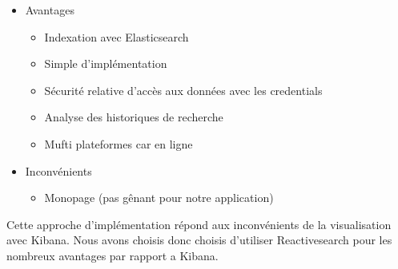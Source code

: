 \newpage
\begin{itemize}
    \item Avantages 
        \begin{itemize}
            \item Indexation avec Elasticsearch
            \item Simple d’implémentation
            \item Sécurité relative d’accès aux données avec les credentials
            \item Analyse des historiques de recherche
            \item Mufti plateformes car en ligne
        \end{itemize}
    \item Inconvénients 
        \begin{itemize}
        \item Monopage (pas gênant pour notre application)
        \end{itemize}
\end{itemize}

Cette approche d’implémentation répond aux inconvénients de la visualisation avec Kibana.
Nous avons choisis donc choisis d'utiliser Reactivesearch pour les nombreux avantages par rapport a Kibana. 
